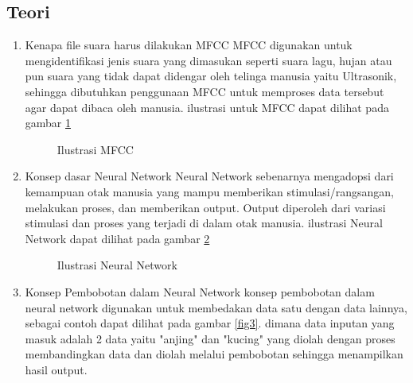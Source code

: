 \subsection{Teori}
\begin{enumerate}
\item Kenapa file suara harus dilakukan MFCC
\subitem MFCC digunakan untuk mengidentifikasi jenis suara yang dimasukan seperti suara lagu, hujan atau pun suara yang tidak dapat didengar oleh telinga manusia yaitu Ultrasonik, sehingga dibutuhkan penggunaan MFCC untuk memproses data tersebut agar dapat dibaca oleh manusia. ilustrasi untuk MFCC dapat dilihat pada gambar \ref{fig1}

\begin{figure}[!htbp]
      \caption{Ilustrasi MFCC}
      \label{fig1}
\end{figure}

\item Konsep dasar Neural Network
\subitem Neural Network sebenarnya mengadopsi dari kemampuan otak manusia yang mampu memberikan stimulasi/rangsangan, melakukan proses, dan memberikan output. Output diperoleh dari variasi stimulasi dan proses yang terjadi di dalam otak manusia.
ilustrasi Neural Network dapat dilihat pada gambar \ref{fig2}

\begin{figure}[!htbp]
      \caption{Ilustrasi Neural Network}
      \label{fig2}
\end{figure}

\item Konsep Pembobotan dalam Neural Network
\subitem konsep pembobotan dalam neural network digunakan untuk membedakan data satu dengan data lainnya, sebagai contoh dapat dilihat pada gambar \ref{fig3}. dimana data inputan yang masuk adalah 2 data yaitu "anjing" dan "kucing" yang diolah dengan proses membandingkan data dan diolah melalui pembobotan sehingga menampilkan hasil output.


\end{enumerate}

